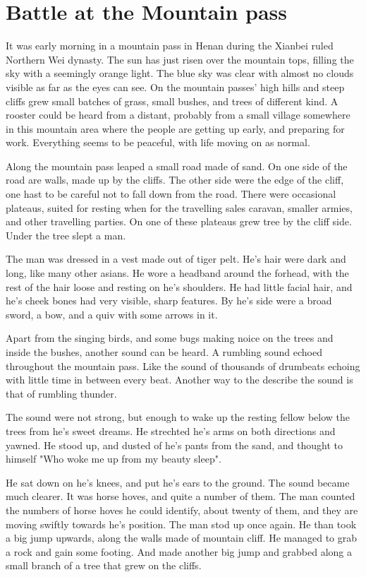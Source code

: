 \chapter{Battle at the Mountain pass}

It was early morning in a mountain pass in Henan during the Xianbei ruled Northern Wei dynasty. The sun has just risen over the mountain tops, filling the sky with a seemingly orange light. The blue sky was clear with almost no clouds visible as far as the eyes can see. On the mountain passes' high hills and steep cliffs grew small batches of grass, small bushes, and trees of different kind.
A rooster could be heard from a distant, probably from a small village somewhere in this mountain area where the people are getting up early, and preparing for work. Everything seems to be peaceful, with life moving on as normal.

Along the mountain pass leaped a small road made of sand. On one side of the road are walls, made up by the cliffs. The other side were the edge of the cliff, one hast to be careful not to fall down from the road. There were occasional plateaus, suited for resting when for the travelling sales caravan, smaller armies, and other travelling parties. On one of these plateaus grew tree by the cliff side. Under the tree slept a man.

The man was dressed in a vest made out of tiger pelt. He's hair were dark and long, like many other asians. He wore a headband around the forhead, with the rest of the hair loose and resting on he's shoulders. He had little facial hair, and he's cheek bones had very visible, sharp features. By he's side were a broad sword, a bow, and a quiv with some arrows in it.

Apart from the singing birds, and some bugs making noice on the trees and inside the bushes, another sound can be heard. A rumbling sound echoed throughout the mountain pass. Like the sound of thousands of drumbeats echoing with little time in between every beat. Another way to the describe the sound is that of rumbling thunder.

The sound were not strong, but enough to wake up the resting fellow below the trees from he's sweet dreams. He strechted he's arms on both directions and yawned. He stood up, and dusted of he's pants from the sand, and thought to himself "Who woke me up from my beauty sleep".

He sat down on he's knees, and put he's ears to the ground. The sound became much clearer. It was horse hoves, and quite a number of them. The man counted the numbers of horse hoves he could identify, about twenty of them, and they are moving swiftly towards he's position. The man stod up once again. He than took a big jump upwards, along the walls made of mountain cliff. He managed to grab a rock and gain some footing. And made another big jump and grabbed along a small branch of a tree that grew on the cliffs.

